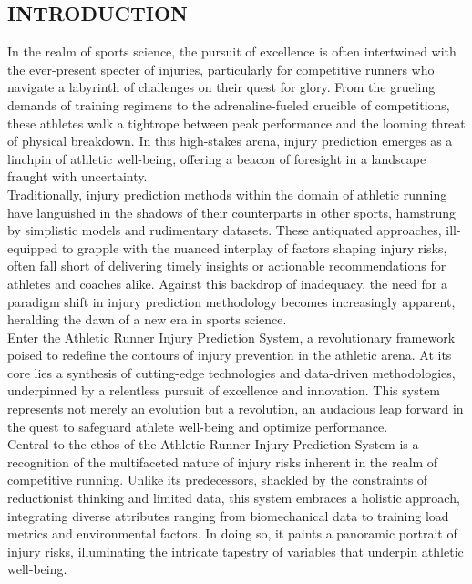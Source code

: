 \documentclass[12pt, English]{article}
\newcommand\tab[1][1cm]{\hspace*{#1}}
\begin{document}
\begin{center}
\section{\Large INTRODUCTION}
\end{center}
\begin{normalsize}

\tab In the realm of sports science, the pursuit of excellence is often intertwined with the ever-present specter of injuries, particularly for competitive runners who navigate a labyrinth of challenges on their quest for glory. From the grueling demands of training regimens to the adrenaline-fueled crucible of competitions, these athletes walk a tightrope between peak performance and the looming threat of physical breakdown. In this high-stakes arena, injury prediction emerges as a linchpin of athletic well-being, offering a beacon of foresight in a landscape fraught with uncertainty.\\

\tab Traditionally, injury prediction methods within the domain of athletic running have languished in the shadows of their counterparts in other sports, hamstrung by simplistic models and rudimentary datasets. These antiquated approaches, ill-equipped to grapple with the nuanced interplay of factors shaping injury risks, often fall short of delivering timely insights or actionable recommendations for athletes and coaches alike. Against this backdrop of inadequacy, the need for a paradigm shift in injury prediction methodology becomes increasingly apparent, heralding the dawn of a new era in sports science.\\

\tab Enter the Athletic Runner Injury Prediction System, a revolutionary framework poised to redefine the contours of injury prevention in the athletic arena. At its core lies a synthesis of cutting-edge technologies and data-driven methodologies, underpinned by a relentless pursuit of excellence and innovation. This system represents not merely an evolution but a revolution, an audacious leap forward in the quest to safeguard athlete well-being and optimize performance.\\

\tab Central to the ethos of the Athletic Runner Injury Prediction System is a recognition of the multifaceted nature of injury risks inherent in the realm of competitive running. Unlike its predecessors, shackled by the constraints of reductionist thinking and limited data, this system embraces a holistic approach, integrating diverse attributes ranging from biomechanical data to training load metrics and environmental factors. In doing so, it paints a panoramic portrait of injury risks, illuminating the intricate tapestry of variables that underpin athletic well-being.\\


\end{normalsize}
\end{document}
